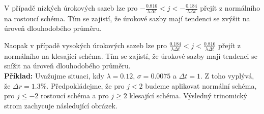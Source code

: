\documentclass[a4paper]{book}
\begin{document}
V případě nízkých úrokových sazeb lze pro $-\frac{0.816}{\lambda \Delta t} < j < -\frac{0.184}{\lambda \Delta t}$ přejít z normálního na rostoucí schéma. Tím se zajistí, že úrokové sazby mají tendenci se zvýšit na úroveň dlouhodobého průměru.

Naopak v případě vysokých úrokových sazeb lze pro $\frac{0.184}{\lambda \Delta t} < j < \frac{0.816}{\lambda \Delta t}$ přejít z normálního na klesající schéma. Tím se zajistí, že úrokové sazby mají tendenci se snížit na úroveň dlouhodobého průměru.\\

\noindent \textbf{Příklad:} Uvažujme situaci, kdy $\lambda = 0.12$, $\sigma = 0.0075$ a $\Delta t = 1$. Z toho vyplývá, že $\Delta r = 1.3\%$. Předpokládejme, že pro $j < 2$ budeme aplikovat normální schéma, pro $j \le -2$ rostoucí schéma a pro $j \ge 2$ klesající schéma. Výsledný trinomický strom zachycuje následující obrázek.
\end{document}
